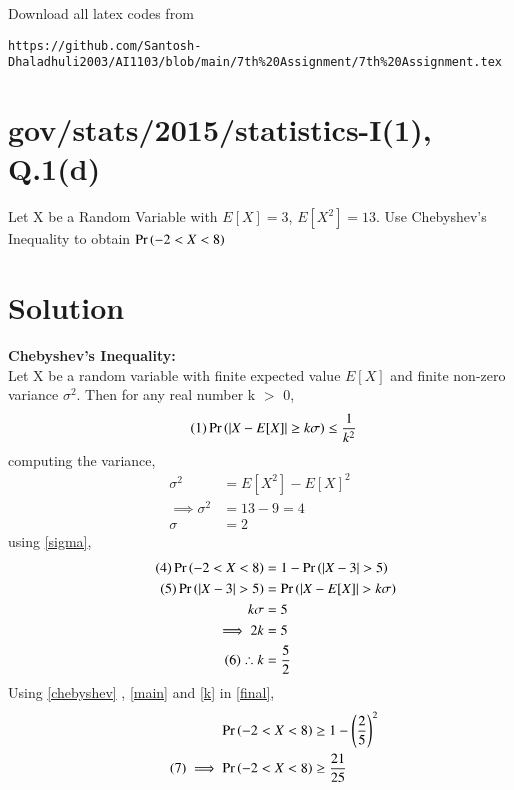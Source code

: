 \documentclass[journal,12pt,twocolumn]{IEEEtran}
\begin{document}
Download all latex codes from 
\begin{lstlisting}
https://github.com/Santosh-Dhaladhuli2003/AI1103/blob/main/7th%20Assignment/7th%20Assignment.tex
\end{lstlisting}
\section{\textbf{gov/stats/2015/statistics-I(1), Q.1(d)}}
Let X be a Random Variable with $E[X] = 3$, $E[X^2] = 13$. Use Chebyshev's Inequality to obtain $\Pr\left(-2 < X < 8\right)$

\section{\textbf{Solution}}
\textbf{Chebyshev's Inequality:}\\
Let X be a random variable with finite expected value $E[X]$ and finite non-zero variance $\sigma^2$. Then for any real number k $>$ 0,
\begin{equation*}
\tag{1} \label{chebyshev}
    \Pr\left(\lvert X - E[X] \rvert \ge k\sigma\right) \le \frac{1}{k^{2}}
\end{equation*}
computing the variance,
\begin{align*}
    \sigma^{2} &= E[X^2] - E[X]^2 \\
    \tag{2}
    \implies \sigma^{2} &= 13 - 9 = 4 \\
    \tag{3} \label{sigma}
    \sigma &= 2
\end{align*}
using \eqref{sigma},
\begin{align*}\
\tag{4} \label{final}
    \Pr\left(-2 < X < 8\right) &= 1 - \Pr\left(\lvert X - 3 \rvert > 5\right) \\
    \tag{5} \label{main}
    \Pr\left(\lvert X - 3 \rvert > 5\right) &= \Pr\left(\lvert X - E[X] \rvert > k\sigma\right) \\
    k\sigma &= 5 \\
    \implies 2k &= 5 \\
    \tag{6} \label{k}
    \therefore k &= \frac{5}{2}
\end{align*}
Using \eqref{chebyshev} , \eqref{main} and \eqref{k} in \eqref{final},
\begin{align*}
    \Pr\left(-2 < X < 8\right) &\ge 1 - \left(\frac{2}{5}\right)^2 \\
    \tag{7} \label{result}
\implies \Pr\left(-2 < X < 8\right) &\ge \frac{21}{25}
\end{align*}
\end{document}
